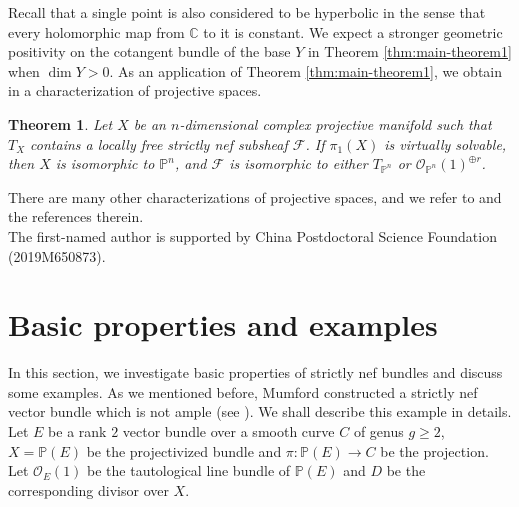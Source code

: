 \documentclass[english,reqno]{amsart}
\newcommand\bbC{{\mathbb C}}
\newcommand\bbP{{\mathbb P}}
\newcommand\sF{{\mathscr F}}
\newcommand\sO{{\mathscr O}}
\theoremstyle{plain}
\newtheorem{thm}{Theorem}[section]
\theoremstyle{definition}
\numberwithin{equation}{section} %
\begin{document}
\noindent Recall that  a single point is also considered to be hyperbolic in the sense that every holomorphic map from $\bbC$ to it is  constant. We expect a stronger geometric positivity on the cotangent bundle of the base $Y$ in Theorem \ref{thm:main-theorem1} when $\dim Y>0$.  
As an application of Theorem \ref{thm:main-theorem1}, we obtain in \cite[Theorem~1.4]{LiuOuYang2020} a characterization  of projective spaces.

\begin{thm}
	\label{thm:simply-connected-Pn}  Let $X$ be an $n$-dimensional  complex projective manifold such that $T_X$ contains a locally free strictly nef subsheaf $\sF$.
	If $\pi_1(X)$ is virtually solvable, then $X$ is isomorphic to  $\bbP^n$, and $\sF$ is isomorphic to either $T_{\bbP^n}$ or $\sO_{\bbP^n}(1)^{\oplus r}$.
\end{thm}


\noindent There are many other characterizations of projective spaces, and we refer to \cite{KobayashiOchiai1973,Peternell1990,CampanaPeternell1998,Druel2004,Hwang2006,Araujo2006,AraujoDruelKovacs2008, Yang2017,Tosatti2017,FengLiuWan2017,Li2018} and the references therein.\\





 The first-named author is supported by China Postdoctoral Science Foundation (2019M650873).




\baselineskip


\section{Basic properties and examples}\label{basic}

In this section, we investigate basic properties of strictly nef bundles and discuss some examples. As we mentioned before, Mumford
constructed a strictly nef vector bundle which is  not ample  (see \cite[Chapter I, Example 10.6]{Hartshorne1970}). We shall describe this example in details. Let $E$ be a rank $2$ vector bundle over a smooth curve $C$ of genus $g\geq 2$,   $X=\bbP(E)$ be the projectivized bundle  and $\pi:\bbP(E)\rightarrow C$ be the projection. Let
$\sO_E(1)$ be the tautological line bundle of $\bbP(E)$ and $D$ be
the corresponding divisor over $X$.
\end{document}
